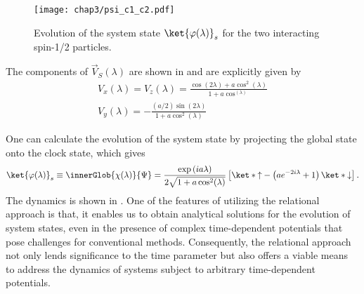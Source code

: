 \begin{figure}[!h]
    \centering
    \texttt{[image: chap3/psi\_c1\_c2.pdf]}
    \caption{Evolution of the system state \(\ket{\varphi(\lambda)}_s\) for the two interacting spin-1/2 particles. }
    \label{fig:2spin_interact_RQM}
\end{figure}

The components of \(\vec{V}_S(\lambda)\) are shown in  and 
are explicitly given by 
\begin{equation}
    \begin{gathered}
        V_x(\lambda) = V_z(\lambda) = \frac{\cos(2\lambda) + a \cos^2(\lambda)}{1 + a\cos^(\lambda)}\\
        V_y(\lambda) = -\frac{(a/2)\sin(2\lambda)}{1 + a \cos^2(\lambda)}
    \end{gathered}
\end{equation}



One can calculate the evolution of the system state by projecting the global state onto the clock state,
which gives
\begin{equation}
    \begin{gathered}
        \ket{\varphi(\lambda)}_s \equiv  \innerGlob{\chi(\lambda)}{\Psi} 
        = \frac{\exp\left(i a\lambda\right)}{
            2\sqrt{1 + a \cos^2(\lambda)}} \left[\ket*{\uparrow} - 
            \left(a e^{-2i\lambda} + 1\right)\ket*{\downarrow}\right] .
    \end{gathered}
\end{equation}
The dynamics is shown in . 
One of the features of utilizing the relational approach is that, 
it enables us to obtain analytical solutions for the evolution of system states, even in the presence of complex time-dependent potentials that pose challenges for conventional methods. Consequently, the relational approach not only lends significance to the time parameter but also offers a viable means to address the dynamics of systems subject to arbitrary time-dependent potentials.



\newpage